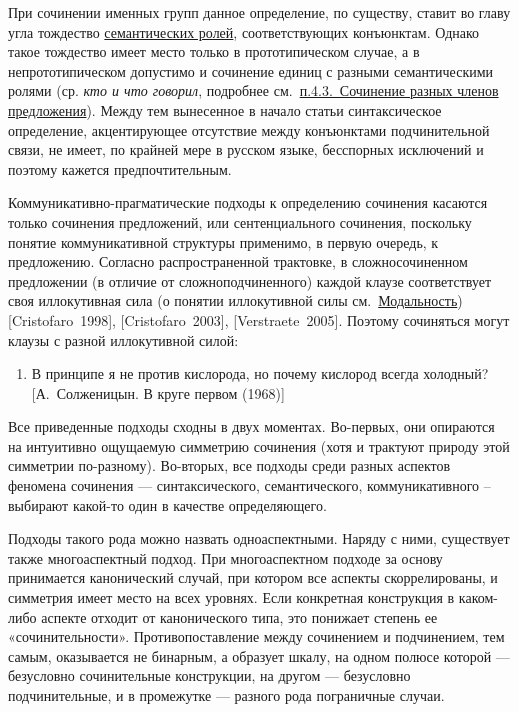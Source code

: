 При сочинении именных групп данное определение, по существу, ставит во
главу угла тождество \underline{семантических ролей}, соответствующих
конъюнктам. Однако такое тождество имеет место только в прототипическом
случае, а в непрототипическом допустимо и сочинение единиц с разными
семантическими ролями (ср. \textit{кто и что говорил}, подробнее
см.~\underline{п.4.3.~Сочинение разных членов предложения}). Между тем
вынесенное в начало статьи синтаксическое определение, акцентирующее
отсутствие между конъюнктами подчинительной связи, не имеет, по крайней
мере в русском языке, бесспорных исключений и поэтому кажется
предпочтительным.

Коммуникативно-прагматические подходы к определению сочинения касаются
только сочинения предложений, или сентенциального сочинения, поскольку
понятие коммуникативной структуры применимо, в первую очередь, к
предложению. Согласно распространенной трактовке, в сложносочиненном
предложении (в отличие от сложноподчиненного) каждой клаузе
соответствует своя иллокутивная сила (о понятии иллокутивной силы
см.~\underline{Модальность}) {[}Cristofaro~1998{]},
{[}Cristofaro~2003{]}, {[}Verstraete~2005{]}. Поэтому сочиняться могут
клаузы с разной иллокутивной силой:

\begin{enumerate}
  \def\labelenumi{(\arabic{enumi})}
  \item
        В принципе я не против кислорода, но почему кислород всегда холодный?
        {[}А.~Солженицын. В круге первом (1968){]}
\end{enumerate}

Все приведенные подходы сходны в двух моментах. Во-первых, они опираются
на интуитивно ощущаемую симметрию сочинения (хотя и трактуют природу
этой симметрии по-разному). Во-вторых, все подходы среди разных аспектов
феномена сочинения --- синтаксического, семантического, коммуникативного
-- выбирают какой-то один в качестве определяющего.

Подходы такого рода можно назвать одноаспектными. Наряду с ними,
существует также многоаспектный подход. При многоаспектном подходе за
основу принимается канонический случай, при котором все аспекты
скоррелированы, и симметрия имеет место на всех уровнях. Если конкретная
конструкция в каком-либо аспекте отходит от канонического типа, это
понижает степень ее «сочинительности». Противопоставление между
сочинением и подчинением, тем самым, оказывается не бинарным, а образует
шкалу, на одном полюсе которой --- безусловно сочинительные конструкции,
на другом --- безусловно подчинительные, и в промежутке --- разного рода
пограничные случаи.

